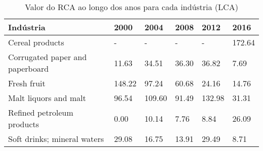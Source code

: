 \begin{table}
\centering
\caption{Valor do RCA ao longo dos anos para cada indústria (LCA)}
\label{tab:ex3-tempo-LCA}
\begin{tabular}{p{6cm}p{1.5cm}p{1.5cm}p{1.5cm}p{1.5cm}p{1.5cm}}
\toprule
                      Indústria &   2000 &   2004 &  2008 &   2012 &   2016 \\
\midrule
                Cereal products &      - &      - &     - &      - & 172.64 \\
Corrugated paper and paperboard &  11.63 &  34.51 & 36.30 &  36.82 &   7.69 \\
                    Fresh fruit & 148.22 &  97.24 & 60.68 &  24.16 &  14.76 \\
          Malt liquors and malt &  96.54 & 109.60 & 91.49 & 132.98 &  31.31 \\
     Refined petroleum products &   0.00 &  10.14 &  7.76 &   8.84 &  26.09 \\
    Soft drinks; mineral waters &  29.08 &  16.75 & 13.91 &  29.49 &   8.71 \\
\bottomrule
\end{tabular}
\end{table}
